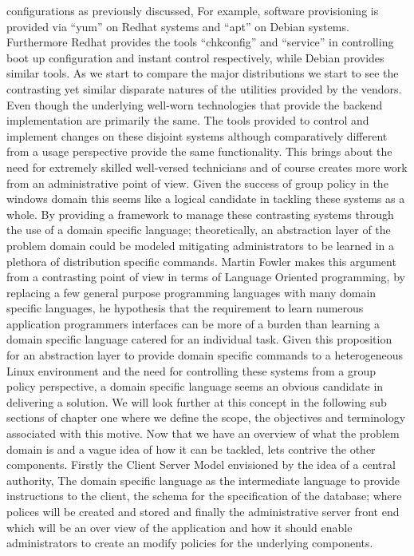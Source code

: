 \begin{multicols}{2}
			configurations as previously discussed, For example, software provisioning is provided via ``yum'' on Redhat systems and ``apt'' 
			on Debian systems. Furthermore Redhat provides the tools ``chkconfig'' and ``service'' in controlling boot up configuration and 
			instant control respectively, while Debian provides similar tools.  As we start to compare the major distributions we start 
			to see the contrasting yet similar disparate natures of the utilities provided by the vendors.  
			\newline
			\newline
			Even though the underlying well-worn technologies that provide the backend implementation are primarily the same.  
			The tools provided to control and implement changes on these disjoint systems although comparatively different from a usage 
			perspective provide the same functionality.  This brings about the need for extremely skilled well-versed technicians and of 
			course creates more work from an administrative point of view.
			\newline
			\newline
			Given the success of group policy in the windows domain this seems like a logical candidate in tackling these systems as a whole.  
			By providing a framework to manage these contrasting systems through the use of a domain specific language; theoretically, an 
			abstraction layer of the problem domain could be modeled mitigating administrators to be learned in a plethora of 
			distribution specific commands.  
			Martin Fowler makes this argument from a contrasting point of view in terms of Language Oriented programming, by replacing a few 
			general purpose programming languages with many domain specific languages, he hypothesis that the requirement to learn numerous 
			application programmers interfaces can be more of a burden than learning a domain specific language catered for an individual task.
			\newline
			\newline
			Given this proposition for an abstraction layer to provide domain specific commands to a heterogeneous Linux environment and the 
			need for controlling these systems from a group policy perspective, a domain specific language seems an obvious candidate in 
			delivering a solution.  We will look further at this concept in the following sub sections of chapter one where we define the scope, 
			the objectives and terminology associated with this motive.
			\newline
			\newline
			Now that we have an overview of what the problem domain is and a vague idea of how it can be tackled, lets contrive the other 
			components.  Firstly the Client Server Model envisioned by the idea of a central authority, The domain specific language as the 
			intermediate language to provide instructions to the client, the schema for the specification of the database; where polices will 
			be created and stored and finally the administrative server front end which will be an over view of the application and how it 
			should enable administrators to create an modify policies for the underlying components.
	    \end{multicols}		
	
